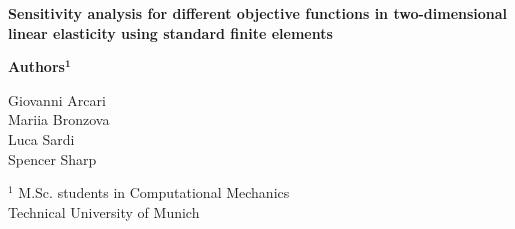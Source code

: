 \thispagestyle{fancy}
\renewcommand{\headrulewidth}{0pt}
\lhead{}
\chead{}

\long{}
\begin{center}\large{\textbf{Sensitivity analysis for different objective functions in two-dimensional linear elasticity using standard finite elements}}\\[10pt]\end{center}
\begin{center} \textbf{Authors}$^{\mathbf{1}}$\\[5pt]\end{center}
\begin{center}Giovanni Arcari\\
Mariia Bronzova\\
Luca Sardi\\
Spencer Sharp\\\end{center}
\begin{center}$^1$ M.Sc. students in Computational Mechanics\\
Technical University of Munich\\[5pt]
\end{center}